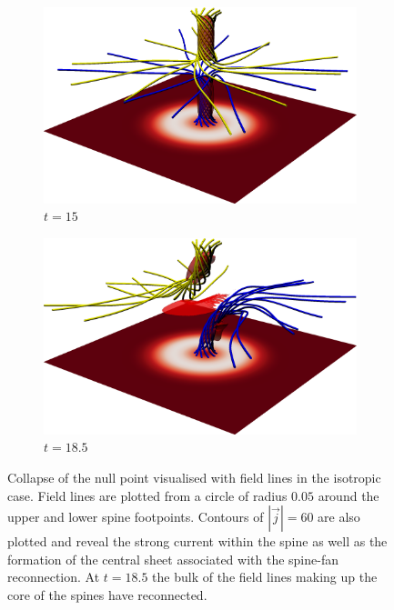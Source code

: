 \begin{figure}[t]
  \centering
    \begin{subfigure}{0.49\textwidth}
      \includegraphics[width=\linewidth]{field_line_plots/cropped/v-4r-4-isotropic_0030_cropped.png}
      \caption{$t=15$}
      \label{fig:v-4r-4-iso-field-30}
    \end{subfigure}
    \hfill
    \begin{subfigure}{0.49\textwidth}
      \includegraphics[width=\linewidth]{field_line_plots/cropped/v-4r-4-isotropic_0037_cropped.png}
      \caption{$t=18.5$}
      \label{fig:v-4r-4-iso-field-37}
    \end{subfigure}
\caption{Collapse of the null point visualised with field lines in the isotropic case. Field lines are plotted from a circle of radius $0.05$ around the upper and lower spine footpoints. Contours of $|\vec{j}| = 60$ are also plotted and reveal the strong current within the spine as well as the formation of the central sheet associated with the spine-fan reconnection. At $t=18.5$ the bulk of the field lines making up the core of the spines have reconnected.}
\label{fig:khi_field_lines_collapse}
\end{figure}

